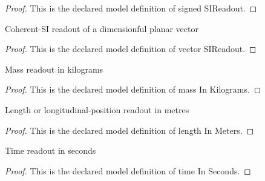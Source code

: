 \begin{proof}
  This is the declared model definition of signed SIReadout.
\end{proof}
\begin{definition}
  \label{def:physics:phyx-mini-0703:phyxminiproblems-problemphyxmini0703-vectorsireadout}
  Coherent-SI readout of a dimensionful planar vector
\end{definition}
\begin{proof}
  This is the declared model definition of vector SIReadout.
\end{proof}
\begin{definition}
  \label{def:physics:phyx-mini-0703:phyxminiproblems-problemphyxmini0703-massinkilograms}
  Mass readout in kilograms
\end{definition}
\begin{proof}
  This is the declared model definition of mass In Kilograms.
\end{proof}
\begin{definition}
  \label{def:physics:phyx-mini-0703:phyxminiproblems-problemphyxmini0703-lengthinmeters}
  Length or longitudinal-position readout in metres
\end{definition}
\begin{proof}
  This is the declared model definition of length In Meters.
\end{proof}
\begin{definition}
  \label{def:physics:phyx-mini-0703:phyxminiproblems-problemphyxmini0703-timeinseconds}
  Time readout in seconds
\end{definition}
\begin{proof}
  This is the declared model definition of time In Seconds.
\end{proof}
